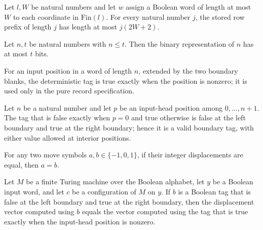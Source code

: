 \begin{lemma}
\label{Complexity.clRowPrefix_length}
\leanok
{}
Let $l,W$ be natural numbers and let $w$ assign a Boolean word of length at most $W$ to
each coordinate in $\mathrm{Fin}(l)$. For every natural number $j$, the stored row
prefix of length $j$ has length at most $j(2W+2)$.
\end{lemma}

\begin{lemma}
\label{Complexity.clElapsed_width}
\leanok
{}
Let $n,t$ be natural numbers with $n\le t$. Then the binary representation of $n$ has at
most $t$ bits.
\end{lemma}

\begin{definition}
\label{Complexity.clTag}
\leanok
For an input position in a word of length $n$, extended by the two boundary blanks, the deterministic tag is true exactly when the position is nonzero; it is used only in the pure record specification.
\end{definition}

\begin{lemma}
\label{Complexity.clTag_valid}
\leanok
{}
Let $n$ be a natural number and let $p$ be an input-head position among $0,\ldots,n+1$.
The tag that is false exactly when $p=0$ and true otherwise is false at the left
boundary and true at the right boundary; hence it is a valid boundary tag, with either
value allowed at interior positions.
\end{lemma}

\begin{lemma}
\label{Complexity.clMove_inj}
\leanok
{}
For any two move symbols $a,b\in\{-1,0,1\}$, if their integer displacements are equal,
then $a=b$.
\end{lemma}

\begin{lemma}
\label{Complexity.clMoves_tag}
\leanok
{}
Let $M$ be a finite Turing machine over the Boolean alphabet, let $y$ be a Boolean input
word, and let $c$ be a configuration of $M$ on $y$. If $b$ is a Boolean tag that is
false at the left boundary and true at the right boundary, then the displacement vector
computed using $b$ equals the vector computed using the tag that is true exactly when
the input-head position is nonzero.
\end{lemma}

